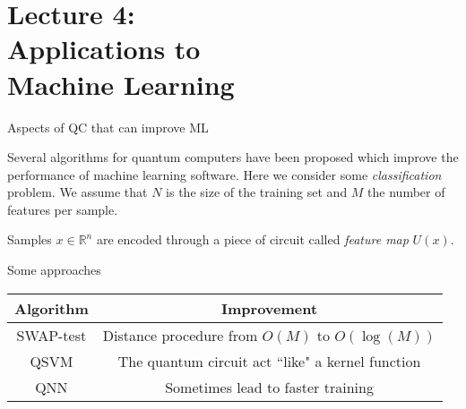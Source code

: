 %

\section{Lecture 4:\\ Applications to\\ Machine Learning}
\SectionPage{}

\begin{frame}{Aspects of QC that can improve ML}

Several algorithms for quantum computers have been proposed which improve the performance of machine learning software. Here we consider some \emph{classification} problem. We assume that \(N\) is the size of the training set and \(M\) the number of features per sample. \bigskip

Samples $x \in \mathbb{R}^n$ are encoded through a piece of circuit called \emph{feature map} $U(x)$.

\end{frame}


\begin{frame}{Some approaches}
\begin{center}
\begin{tabular}{c c}
    Algorithm & Improvement \\ \midrule
    SWAP-test & Distance procedure from \(O(M)\) to \(O(\log(M))\)  \\[1em]
    QSVM & The quantum circuit act ``like" a kernel function  \\[1em]
    QNN & Sometimes lead to faster training  \\[1em]
\end{tabular}
\end{center}
\end{frame}

%

%

